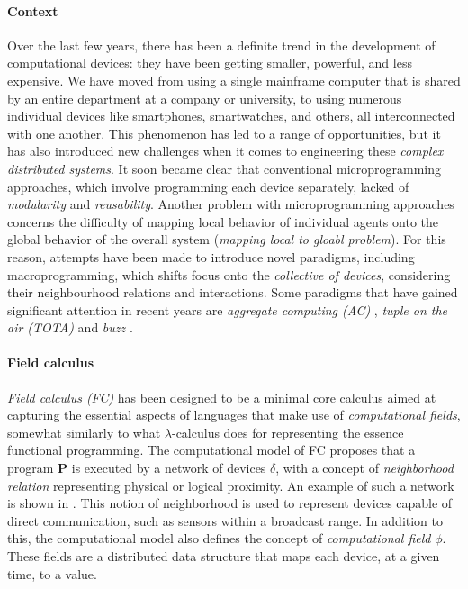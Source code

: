 \documentclass[12pt,a4paper,openright,twoside]{book}
\begin{document}
\paragraph{Context}
Over the last few years, there has been a definite trend in the development of computational devices: 
    they have been getting smaller, powerful, and less expensive. We have moved from using a 
    single mainframe computer that is shared by an entire department at a company or university, 
    to using numerous individual devices like smartphones, smartwatches, and others, all interconnected
    with one another. This phenomenon has led to a range of opportunities, but it has also introduced 
    new challenges when it comes to engineering these \emph{complex distributed systems}. It soon became clear 
    that conventional microprogramming approaches, which involve programming each device separately, lacked of 
    \emph{modularity} and \emph{reusability}. Another problem with microprogramming approaches concerns the 
    difficulty of mapping local behavior of individual agents onto the global behavior of the overall system
    (\emph{mapping local to gloabl problem}). 
    For this reason, attempts have been made to introduce novel paradigms, including 
    macroprogramming, which shifts focus onto the \emph{collective of devices}, considering their neighbourhood 
    relations and interactions.
    Some paradigms that have gained significant attention in recent years are \emph{aggregate computing (AC)} \cite{AC}, 
    \emph{tuple on the air (TOTA)} \cite{tota} and \emph{buzz} \cite{7498536}.

\paragraph{Field calculus}
\emph{Field calculus (FC)} \cite{fieldcalculus} has been designed to be a minimal core calculus aimed at capturing the essential 
    aspects of languages that make use of \emph{computational fields}, somewhat similarly to what $\lambda$-calculus does for 
    representing the essence functional programming. 
    The computational model of FC proposes that a program \textbf{P} is executed by a network of devices $\delta$, with a concept 
    of \emph{neighborhood relation} representing physical or logical proximity. An example of such a network is shown in . 
    This notion of neighborhood is used to represent devices capable of direct communication, such as sensors within a broadcast range. 
    In addition to this, the computational model also defines the concept of \emph{computational field} $\phi$. 
    These fields \cite{VIROLI2019100486, 1316820} are 
    a distributed data structure that maps each device, at a given time, to a value.
\end{document}
